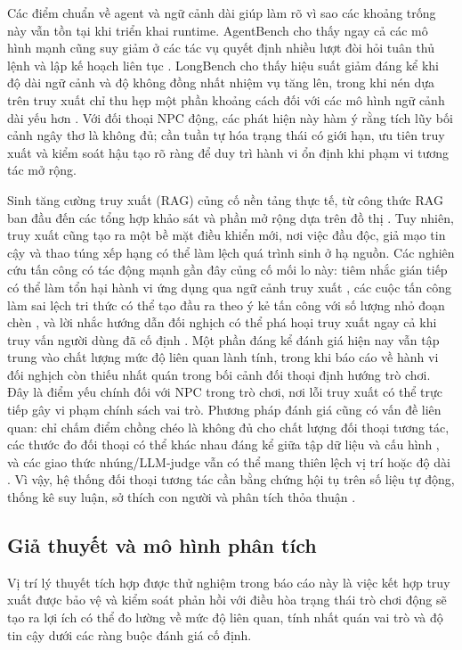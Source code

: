 ﻿\documentclass[a4paper,12pt]{article}
\begin{document}
Các điểm chuẩn về agent và ngữ cảnh dài giúp làm rõ vì sao các khoảng trống này vẫn tồn tại khi triển khai runtime. AgentBench cho thấy ngay cả các mô hình mạnh cũng suy giảm ở các tác vụ quyết định nhiều lượt đòi hỏi tuân thủ lệnh và lập kế hoạch liên tục \cite{Liu2023AgentBench}. LongBench cho thấy hiệu suất giảm đáng kể khi độ dài ngữ cảnh và độ không đồng nhất nhiệm vụ tăng lên, trong khi nén dựa trên truy xuất chỉ thu hẹp một phần khoảng cách đối với các mô hình ngữ cảnh dài yếu hơn \cite{Bai2024LongBench}. Với đối thoại NPC động, các phát hiện này hàm ý rằng tích lũy bối cảnh ngây thơ là không đủ; cần tuần tự hóa trạng thái có giới hạn, ưu tiên truy xuất và kiểm soát hậu tạo rõ ràng để duy trì hành vi ổn định khi phạm vi tương tác mở rộng.

Sinh tăng cường truy xuất (RAG) củng cố nền tảng thực tế, từ công thức RAG ban đầu đến các tổng hợp khảo sát và phần mở rộng dựa trên đồ thị \cite{Lewis2020RAG,Fan2024RAGSurvey,Edge2024GraphRAG}. Tuy nhiên, truy xuất cũng tạo ra một bề mặt điều khiển mới, nơi việc đầu độc, giả mạo tin cậy và thao túng xếp hạng có thể làm lệch quá trình sinh ở hạ nguồn. Các nghiên cứu tấn công có tác động mạnh gần đây củng cố mối lo này: tiêm nhắc gián tiếp có thể làm tổn hại hành vi ứng dụng qua ngữ cảnh truy xuất \cite{Greshake2023PromptInjection}, các cuộc tấn công làm sai lệch tri thức có thể tạo đầu ra theo ý kẻ tấn công với số lượng nhỏ đoạn chèn \cite{Zou2025PoisonedRAG}, và lời nhắc hướng dẫn đối nghịch có thể phá hoại truy xuất ngay cả khi truy vấn người dùng đã cố định \cite{Chaturvedi2025AIP}. Một phần đáng kể đánh giá hiện nay vẫn tập trung vào chất lượng mức độ liên quan lành tính, trong khi báo cáo về hành vi đối nghịch còn thiếu nhất quán trong bối cảnh đối thoại định hướng trò chơi. Đây là điểm yếu chính đối với NPC trong trò chơi, nơi lỗi truy xuất có thể trực tiếp gây vi phạm chính sách vai trò. Phương pháp đánh giá cũng có vấn đề liên quan: chỉ chấm điểm chồng chéo là không đủ cho chất lượng đối thoại tương tác, các thước đo đối thoại có thể khác nhau đáng kể giữa tập dữ liệu và cấu hình \cite{Yeh2021DialogMetrics}, và các giao thức nhúng/LLM-judge vẫn có thể mang thiên lệch vị trí hoặc độ dài \cite{Zhang2020BERTScore,Zheng2023MTBench,Wang2024Judge,Dubois2024AlpacaEval}. Vì vậy, hệ thống đối thoại tương tác cần bằng chứng hội tụ trên số liệu tự động, thống kê suy luận, sở thích con người và phân tích thỏa thuận \cite{Cohen1960Kappa}.

\subsection{Giả thuyết và mô hình phân tích}
Vị trí lý thuyết tích hợp được thử nghiệm trong báo cáo này là việc kết hợp truy xuất được bảo vệ và kiểm soát phản hồi với điều hòa trạng thái trò chơi động sẽ tạo ra lợi ích có thể đo lường về mức độ liên quan, tính nhất quán vai trò và độ tin cậy dưới các ràng buộc đánh giá cố định.
\end{document}
